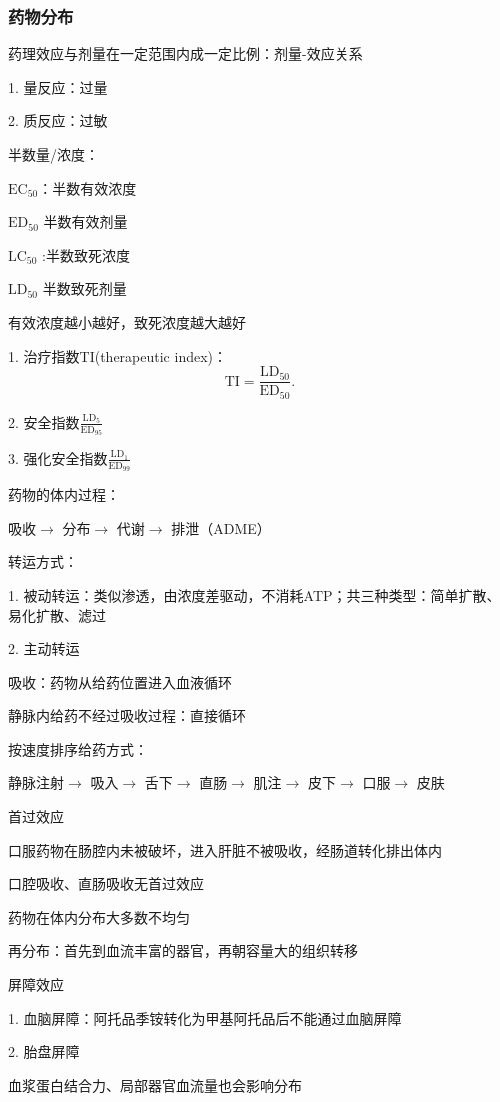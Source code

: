 \subsubsection{药物分布}%
\label{subsub:药物分布}
\begin{notation}
    药理效应与剂量在一定范围内成一定比例：剂量-效应关系

    1. 量反应：过量

    2. 质反应：过敏
\end{notation}
\begin{notation}
    半数量/浓度：

    $\text{EC}_{50}$：半数有效浓度

    $\text{ED}_{50}$ 半数有效剂量

    $\text{LC}_{50}$ :半数致死浓度

    $\text{LD}_{50}$ 半数致死剂量

    有效浓度越小越好，致死浓度越大越好
\end{notation}
\begin{notation}
    1. 治疗指数TI(therapeutic index)：
    \[
        \text{TI}=\frac{\text{LD}_{50}}{\text{ED}_{50}}
    .\] 

    2. 安全指数$\displaystyle{\frac{\text{LD}_{5}}{\text{ED}_{95}}} $

    3. 强化安全指数$\displaystyle{\frac{\text{LD}_1}{\text{ED}_{99}}}$
\end{notation}
\begin{notation}
    药物的体内过程：

    吸收$\to $ 分布$\to $ 代谢$\to $ 排泄（ADME）

    转运方式：

    1. 被动转运：类似渗透，由浓度差驱动，不消耗ATP；共三种类型：简单扩散、易化扩散、滤过

    2. 主动转运
\end{notation}
\begin{defi}
    吸收：药物从给药位置进入血液循环

    静脉内给药不经过吸收过程：直接循环
\end{defi}
按速度排序给药方式：

静脉注射$\to $ 吸入$\to $ 舌下$\to $ 直肠$\to $ 肌注$\to $ 皮下$\to $ 口服$\to $ 皮肤
\begin{notation}
    首过效应

    口服药物在肠腔内未被破坏，进入肝脏不被吸收，经肠道转化排出体内

    口腔吸收、直肠吸收无首过效应
\end{notation}
药物在体内分布大多数不均匀
\begin{notation}
    再分布：首先到血流丰富的器官，再朝容量大的组织转移
\end{notation}
\begin{notation}
    屏障效应

    1. 血脑屏障：阿托品季铵转化为甲基阿托品后不能通过血脑屏障

    2. 胎盘屏障
\end{notation}
血浆蛋白结合力、局部器官血流量也会影响分布
